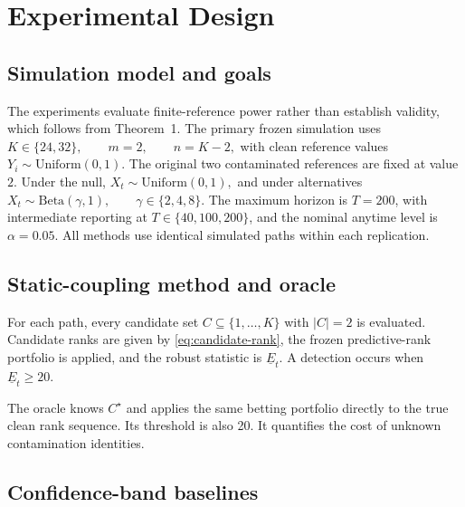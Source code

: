 \section{Experimental Design}

\subsection{Simulation model and goals}

The experiments evaluate finite-reference power rather than establish validity, which follows from Theorem~1. The primary frozen simulation uses
\(K\in\{24,32\},\qquad m=2,\qquad n=K-2,\)
with clean reference values \(Y_i\sim\mathrm{Uniform}(0,1)\). The original two contaminated references are fixed at value \(2\). Under the null,
\(X_t\sim\mathrm{Uniform}(0,1),\)
and under alternatives
\(X_t\sim\mathrm{Beta}(\gamma,1), \qquad \gamma\in\{2,4,8\}.\)
The maximum horizon is \(T=200\), with intermediate reporting at \(T\in\{40,100,200\}\), and the nominal anytime level is \(\alpha=0.05\). All methods use identical simulated paths within each replication.

\subsection{Static-coupling method and oracle}

For each path, every candidate set \(C\subseteq\{1,\ldots,K\}\) with \(|C|=2\) is evaluated. Candidate ranks are given by \eqref{eq:candidate-rank}, the frozen predictive-rank portfolio is applied, and the robust statistic is \(\underline E_t\). A detection occurs when
\(\underline E_t\ge20.\)

The oracle knows \(C^\star\) and applies the same betting portfolio directly to the true clean rank sequence. Its threshold is also 20. It quantifies the cost of unknown contamination identities.

\subsection{Confidence-band baselines}

